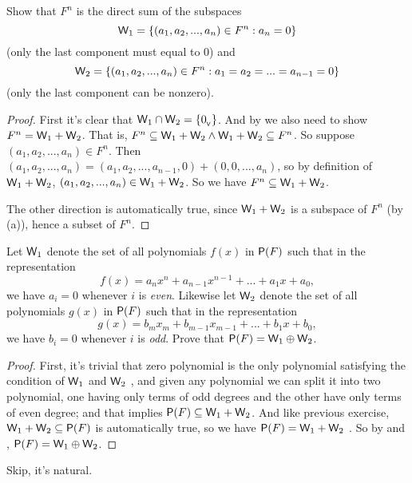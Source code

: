 \begin{exercise} \label{exercise 1.3.24}
Show that \(F^n\) is the direct sum of the subspaces
\[
    \textsf{W}_1 = \{(a_1, a_2, ..., a_n) \in F^n : a_n = 0 \}
\]
(only the last component must equal to \(0\)) and
\[
    \textsf{W}_2 = \{(a_1, a_2, ..., a_n) \in F^n : a_1 = a_2 = ... = a_{n - 1} = 0 \}
\]
(only the last component can be nonzero).
\end{exercise}

\begin{proof}
First it's clear that \(\textsf{W}_1 \cap \textsf{W}_2 = \{ 0_{_{\textsf{V}}} \}\).
And by  we also need to show \(F^n = \textsf{W}_1 + \textsf{W}_2\).
That is, \(F^n \subseteq \textsf{W}_1 + \textsf{W}_2 \land \textsf{W}_1 + \textsf{W}_2 \subseteq F^n\).
So suppose \((a_1, a_2, ..., a_n) \in F^n\).
Then \((a_1, a_2, ..., a_n) = (a_1, a_2, ..., a_{n - 1}, 0) + (0, 0, ..., a_n)\), so by definition of \(\textsf{W}_1 + \textsf{W}_2\), \((a_1, a_2, ..., a_n) \in \textsf{W}_1 + \textsf{W}_2\).
So we have \(F^n \subseteq \textsf{W}_1 + \textsf{W}_2\).

The other direction is automatically true, since \(\textsf{W}_1 + \textsf{W}_2\) is a subspace of \(F^n\) (by (a)), hence a subset of \(F^n\).
\end{proof}

\begin{exercise} \label{exercise 1.3.25}
Let \(\textsf{W}_1\) denote the set of all polynomials \(f(x)\) in \(\textsf{P}(F)\) such that in the representation
\[
    f(x) = a_n x^n + a_{n - 1} x^{n - 1} + ... + a_1 x + a_0,
\]
we have \(a_i = 0\) whenever \(i\) is \emph{even}.
Likewise let \(\textsf{W}_2\) denote the set of all polynomials \(g(x)\) in \(\textsf{P}(F)\) such that in the representation
\[
    g(x) = b_m x_m + b_{m - 1} x_{m - 1} + ... + b_1 x + b_0,
\]
we have \(b_i = 0\) whenever \(i\) is \emph{odd}.
Prove that \(\textsf{P}(F) = \textsf{W}_1 \oplus \textsf{W}_2\).
\end{exercise}

\begin{proof}
First, it's trivial that zero polynomial is the only polynomial satisfying the condition of \(\textsf{W}_1\) and \(\textsf{W}_2\) ,
and given any polynomial we can split it into two polynomial, one having only terms of odd degrees and the other have only terms of even degree;
and that implies \(\textsf{P}(F) \subseteq \textsf{W}_1 + \textsf{W}_2\).
And like previous exercise, \(\textsf{W}_1 + \textsf{W}_2 \subseteq \textsf{P}(F)\) is automatically true, so we have \(\textsf{P}(F) = \textsf{W}_1 + \textsf{W}_2\) .
So by  and , \(\textsf{P}(F) = \textsf{W}_1 \oplus \textsf{W}_2\).
\end{proof}

\begin{exercise} \label{exercise 1.3.26}
Skip, it's natural.
\end{exercise}

